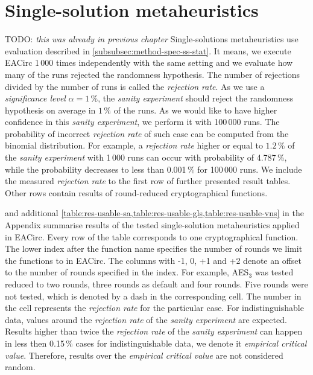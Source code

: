 \documentclass[
    digital,    %
    oneside,    %
    color,
    11pt,
    nocover,
    notable,
    nolof,
    nolot,
]{fithesis3}
\newcommand{\todo}[1]{TODO: \textit{#1}}
\begin{document}
\section{Single-solution metaheuristics}
\label{sec:res-ss}

\todo{this was already in previous chapter}
Single-solutions metaheuristics use evaluation described in \cref{subsubsec:method-spec-ss-stat}. It means, we execute EACirc 1\,000 times independently with the same setting and we evaluate how many of the runs rejected the randomness hypothesis. The number of rejections divided by the number of runs is called the \textit{rejection rate}. As we use a \textit{significance level} $\alpha=1\,\%$, the \textit{sanity experiment} should reject the randomness hypothesis on average in $1\,\%$ of the runs. As we would like to have higher confidence in this \textit{sanity experiment}, we perform it with 100\,000 runs. The probability of incorrect \textit{rejection rate} of such case can be computed from the binomial distribution. For example, a \textit{rejection rate} higher or equal to $1.2\,\%$ of the \textit{sanity experiment} with 1\,000 runs can occur with probability of 4.787\,\%, while the probability decreases to less than 0.001\,\% for 100\,000 runs. We include the measured \textit{rejection rate} to the first row of further presented result tables. Other rows contain results of round-reduced cryptographical functions.

 and additional \cref{table:res-usable-sa,table:res-usable-gls,table:res-usable-vns} in the Appendix summarise results of the tested single-solution metaheuristics applied in EACirc. Every row of the table corresponds to one cryptographical function. The lower index after the function name specifies the number of rounds we limit the functions to in EACirc. The columns with -1, 0, +1 and +2 denote an offset to the number of rounds specified in the index. For example, AES$_{3}$ was tested reduced to two rounds, three rounds as default and four rounds. Five rounds were not tested, which is denoted by a dash in the corresponding cell. The number in the cell represents the \textit{rejection rate} for the particular case. For indistinguishable data, values around the \textit{rejection rate} of the \textit{sanity experiment} are expected. Results higher than twice the \textit{rejection rate} of the \textit{sanity experiment} can happen in less then 0.15\,\% cases for indistinguishable data, we denote it \textit{empirical critical value}. Therefore, results over the \textit{empirical critical value} are not considered random.
\end{document}

